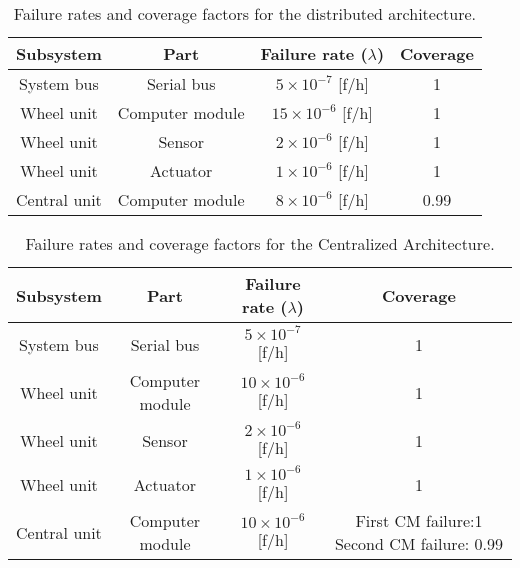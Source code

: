 \begin{table}[h]
\centering
\begin{tabular}{| c | c | c | c |}
\hline 
\textbf{Subsystem} & \textbf{Part} & \textbf{Failure rate ($\lambda$)} & \textbf{Coverage}\\
\hline
System bus & Serial bus& $5 \times 10 ^{-7}$ [f/h] & 1\\
\hline
Wheel unit & Computer module & $15 \times 10 ^{-6}$ [f/h]  & 1\\
\hline
Wheel unit & Sensor & $2 \times 10 ^{-6}$ [f/h]  & 1\\
\hline
Wheel unit & Actuator & $1 \times 10 ^{-6}$ [f/h]  & 1\\
\hline
Central unit & Computer module & $8 \times 10 ^{-6}$ [f/h]  & 0.99\\
\hline
\end{tabular}
\caption{Failure rates and coverage factors for the distributed architecture.}
\label{tab:faildist}


\end{table}
\begin{table}[h]
\centering
\begin{tabular}{| c | c | c | c |}
\hline 
\textbf{Subsystem} & \textbf{Part} & \textbf{Failure rate ($\lambda$)} & \textbf{Coverage}\\
\hline
System bus & Serial bus& $5 \times 10 ^{-7}$ [f/h]  & 1\\
\hline
Wheel unit & Computer module & $10 \times 10 ^{-6}$ [f/h]  & 1\\
\hline
Wheel unit & Sensor & $2 \times 10 ^{-6}$ [f/h]  & 1\\
\hline
Wheel unit & Actuator & $1 \times 10 ^{-6}$ [f/h]  & 1\\
\hline
Central unit & Computer module & $10 \times 10 ^{-6}$ [f/h]  & First CM failure:1  Second CM failure: 0.99\\
\hline
\end{tabular}
\caption{Failure rates and coverage factors for the Centralized Architecture.}
\label{tab:failcent}
\end{table}
